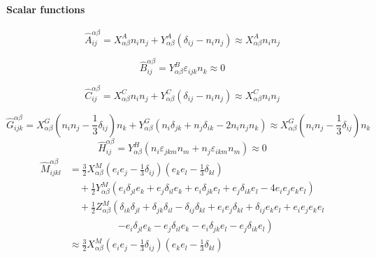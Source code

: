 \documentclass[12pt]{article}
\begin{document}
\paragraph{Scalar functions}

\begin{equation*}
  \hat{A}_{ij}^{\alpha \beta}
  = 
  X_{\alpha \beta}^{A} n_i n_j
  +
  Y_{\alpha \beta}^{A} (\delta_{ij} - n_i n_j)
 \approx   X_{\alpha \beta}^{A} n_i n_j
\end{equation*}

\begin{equation*}
  \hat{B}_{ij}^{\alpha \beta}
  = 
  Y_{\alpha \beta}^{B}   \varepsilon_{ijk} n_k
\approx 0
\end{equation*}

\begin{equation*}
  \hat{C}_{ij}^{\alpha \beta}
  = 
  X_{\alpha \beta}^{C} n_i n_j
  +
  Y_{\alpha \beta}^{C} (\delta_{ij} - n_i n_j)
 \approx
  X_{\alpha \beta}^{C} n_i n_j
\end{equation*}

\begin{equation*}
 \hat{G}_{ijk}^{\alpha \beta}
 = 
X_{\alpha\beta}^{G} 
\left(n_i n_j - \frac{1}{3}\delta_{ij}\right)n_k
+
Y_{\alpha\beta}^{G}
\left(
n_i \delta_{jk} + n_j \delta_{ik} - 2 n_i n_j n_k
\right)
\approx
X_{\alpha\beta}^{G} 
\left(n_in_j - \frac{1}{3}\delta_{ij}\right)n_k
\end{equation*}
\begin{equation*}
 \hat{H}_{ij}^{\alpha\beta}
 = Y_{\alpha\beta}^{H}
(n_i \varepsilon_{jkm} n_m 
+ n_j \varepsilon_{ikm} n_m )
 \approx 0
\end{equation*}
\begin{align*}
 \hat{M}_{ijkl}^{\alpha\beta}
& = 
\frac{3}{2}
X_{\alpha\beta}^{M}
 \left(e_i e_j
 - \frac{1}{3} \delta_{ij}
\right)
 \left(e_k e_l
 - \frac{1}{3} \delta_{kl}
\right) \\
& \quad
+
\frac{1}{2} 
Y_{\alpha\beta}^{M}
\left(
e_i \delta_{jl} e_k
+
e_j \delta_{il} e_k
+
e_i \delta_{jk} e_l
+
e_j \delta_{ik} e_l
-
4 e_i e_j e_k e_l
\right) \\
&\quad
+ 
\frac{1}{2}
Z_{\alpha\beta}^{M}
\left(
\delta_{ik}\delta_{jl}
+
\delta_{jk}\delta_{il}
-
\delta_{ij}\delta_{kl}
+
e_i e_j \delta_{kl} 
+
\delta_{ij} e_k e_l
+
e_i e_j e_k e_l \right.\\
&\qquad \qquad \quad
\left.
- 
e_i \delta_{jl} e_k
-
e_j \delta_{il} e_k
-
e_i \delta_{jk} e_l
-
e_j \delta_{ik} e_l
\right) \\
&\approx
\frac{3}{2}
 X_{\alpha\beta}^{M}
 \left(e_i e_j
 - \frac{1}{3} \delta_{ij}
\right)
 \left(e_k e_l
 - \frac{1}{3} \delta_{kl}
\right)
\end{align*}
\end{document}
